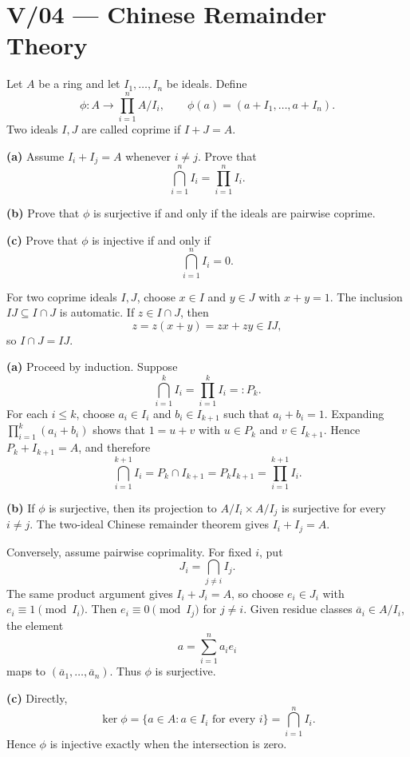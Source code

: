 \section*{V/04 --- Chinese Remainder Theory}

\begin{problem}[CP-V-0001]
\label{prob:cp-v-0001}
Let \(A\) be a ring and let \(I_1,\dots,I_n\) be ideals. Define
\[
\phi:A\longrightarrow \prod_{i=1}^n A/I_i,
\qquad
\phi(a)=(a+I_1,\dots,a+I_n).
\]
Two ideals \(I,J\) are called coprime if \(I+J=A\).

\textbf{(a)} Assume \(I_i+I_j=A\) whenever \(i\ne j\). Prove that
\[
\bigcap_{i=1}^n I_i=\prod_{i=1}^n I_i.
\]

\textbf{(b)} Prove that \(\phi\) is surjective if and only if the ideals are pairwise coprime.

\textbf{(c)} Prove that \(\phi\) is injective if and only if
\[
\bigcap_{i=1}^n I_i=0.
\]
\end{problem}

\begin{solution}
For two coprime ideals \(I,J\), choose \(x\in I\) and \(y\in J\) with \(x+y=1\).
The inclusion \(IJ\subseteq I\cap J\) is automatic. If \(z\in I\cap J\), then
\[
z=z(x+y)=zx+zy\in IJ,
\]
so \(I\cap J=IJ\).

\textbf{(a)} Proceed by induction. Suppose
\[
\bigcap_{i=1}^k I_i=\prod_{i=1}^k I_i=:P_k.
\]
For each \(i\le k\), choose \(a_i\in I_i\) and \(b_i\in I_{k+1}\) such that
\(a_i+b_i=1\). Expanding \(\prod_{i=1}^k(a_i+b_i)\) shows that
\(1=u+v\) with \(u\in P_k\) and \(v\in I_{k+1}\). Hence
\(P_k+I_{k+1}=A\), and therefore
\[
\bigcap_{i=1}^{k+1}I_i
=P_k\cap I_{k+1}
=P_kI_{k+1}
=\prod_{i=1}^{k+1}I_i.
\]

\textbf{(b)} If \(\phi\) is surjective, then its projection to
\(A/I_i\times A/I_j\) is surjective for every \(i\ne j\). The two-ideal
Chinese remainder theorem gives \(I_i+I_j=A\).

Conversely, assume pairwise coprimality. For fixed \(i\), put
\[
J_i=\bigcap_{j\ne i} I_j.
\]
The same product argument gives \(I_i+J_i=A\), so choose \(e_i\in J_i\)
with \(e_i\equiv1\pmod{I_i}\). Then \(e_i\equiv0\pmod{I_j}\) for
\(j\ne i\). Given residue classes \(\overline a_i\in A/I_i\), the element
\[
a=\sum_{i=1}^n a_i e_i
\]
maps to \((\overline a_1,\dots,\overline a_n)\). Thus \(\phi\) is surjective.

\textbf{(c)} Directly,
\[
\ker\phi
=\{a\in A:a\in I_i\text{ for every }i\}
=\bigcap_{i=1}^n I_i.
\]
Hence \(\phi\) is injective exactly when the intersection is zero.
\end{solution}


